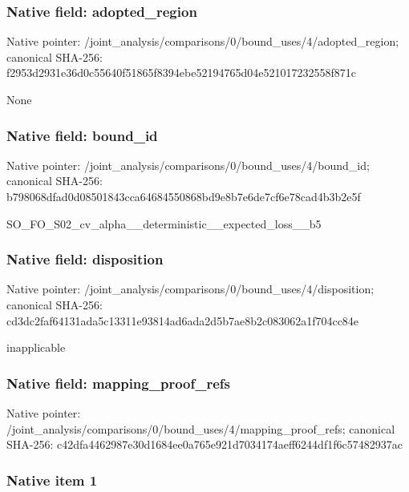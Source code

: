 \documentclass[10pt,a4paper]{article}
\begin{document}
\subsubsection{Native field: adopted\_region}


Native pointer: /joint\_analysis/comparis\allowbreak{}ons/0/bound\_uses/4/adopt\allowbreak{}ed\_region; canonical SHA-256: f2953d2931e36d0c55640f51\allowbreak{}865f8394ebe52194765d04e5\allowbreak{}21017232558f871c


None


\subsubsection{Native field: bound\_id}


Native pointer: /joint\_analysis/comparis\allowbreak{}ons/0/bound\_uses/4/bound\allowbreak{}\_id; canonical SHA-256: b798068dfad0d08501843cca\allowbreak{}64684550868bd9e8b7e6de7c\allowbreak{}f6e78cad4b3b2e5f


SO\_FO\_S02\_cv\_alpha\_\_dete\allowbreak{}rministic\_\_expected\_loss\allowbreak{}\_\_b5


\subsubsection{Native field: disposition}


Native pointer: /joint\_analysis/comparis\allowbreak{}ons/0/bound\_uses/4/dispo\allowbreak{}sition; canonical SHA-256: cd3dc2faf64131ada5c13311\allowbreak{}e93814ad6ada2d5b7ae8b2c0\allowbreak{}83062a1f704cc84e


inapplicable


\subsubsection{Native field: mapping\_proof\_refs}


Native pointer: /joint\_analysis/comparis\allowbreak{}ons/0/bound\_uses/4/mappi\allowbreak{}ng\_proof\_refs; canonical SHA-256: c42dfa4462987e30d1684ee0\allowbreak{}a765e921d7034174aeff6244\allowbreak{}df1f6c57482937ac



\subsubsection{Native item 1}
\end{document}
